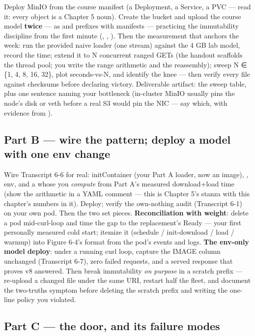 Deploy MinIO from the course manifest (a Deployment, a Service, a PVC — read it: every object is a Chapter 5 noun). Create the bucket and upload the course model \textbf{twice} — as  and  prefixes with manifests — practicing the immutability discipline from the first minute (, , ). Then the measurement that anchors the week: run the provided naive loader (one stream) against the 4 GB lab model, record the time; extend it to N concurrent ranged GETs (the handout scaffolds the thread pool; you write the range arithmetic and the reassembly); sweep N ∈ \{1, 4, 8, 16, 32\}, plot seconds-vs-N, and identify the knee — then verify every file against  checksums before declaring victory. Deliverable artifact: the sweep table, plus one sentence naming your bottleneck (in-cluster MinIO usually pins the node's disk or veth before a real S3 would pin the NIC — say which, with evidence from ).

\subsection*{Part B — wire the pattern; deploy a model with one env change}

Wire Transcript 6-6 for real: initContainer (your Part A loader, now an image), ,  env, and a  whose  you \textit{compute} from Part A's measured download+load time (show the arithmetic in a YAML comment — this is Chapter 5's stanza with this chapter's numbers in it). Deploy; verify the own-nothing audit (Transcript 6-1) on your own pod. Then the two set pieces. \textbf{Reconciliation with weight}: delete a pod mid-curl-loop and time the gap to the replacement's Ready — your first personally measured cold start; itemize it (schedule / init-download / load / warmup) into Figure 6-4's format from the pod's events and logs. \textbf{The env-only model deploy}:  under a running curl loop, capture the IMAGE column unchanged (Transcript 6-7), zero failed requests, and a served response that proves v8 answered. Then break immutability \textit{on purpose} in a scratch prefix — re-upload a changed file under the same URI, restart half the fleet, and document the two-truths symptom before deleting the scratch prefix and writing the one-line policy you violated.

\subsection*{Part C — the door, and its failure modes}

